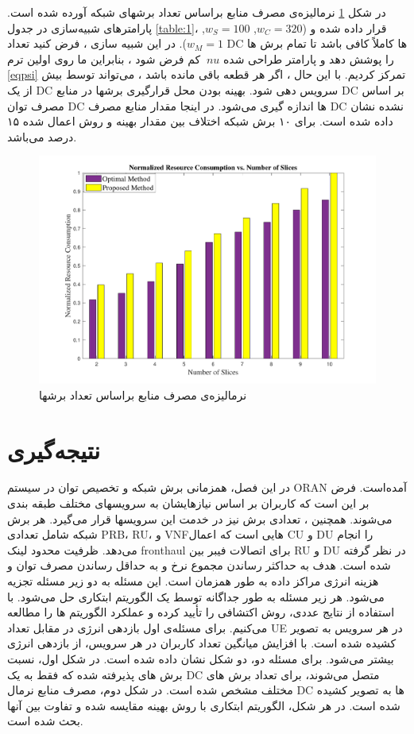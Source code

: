 در شکل \ref{fig:f2}
نرمالیزه‌ی مصرف منابع بر‌اساس تعداد برشهای شبکه آورده شده است. پارامترهای شبیه‌سازی در جدول \ref{table:1}، قرار داده شده و 
($w_C = 320$, $w_S = 100$, $w_M =1$).
در این شبیه سازی ، فرض کنید تعداد DC ها کاملاً کافی باشد تا تمام برش ها را پوشش دهد و پارامتر طراحی شده $ \ nu $ کم فرض شود ، بنابراین ما روی اولین ترم \eqref{eqpsi} تمرکز کردیم.
با این حال ، اگر هر قطعه باقی مانده باشد ، می‌تواند توسط بیش از یک DC سرویس دهی شود.
بهینه بودن محل قرارگیری برشها در منابع DC بر اساس مصرف توان DC ها اندازه گیری می‌شود.
در اینجا مقدار منابع  مصرف DC نشده نشان داده شده است. برای ۱۰ برش شبکه اختلاف بین مقدار بهینه و روش اعمال شده ۱۵ درصد می‌باشد. 
\begin{figure}%
	\centering
	\includegraphics[scale = 0.5]{./fig/fig22_last} %
	\caption{نرمالیزه‌ی مصرف منابع بر‌اساس تعداد برشها}
	\label{fig:f2}
\end{figure}
\section{نتیجه‌گیری}
در این فصل، همزمانی برش شبکه و تخصیص توان در سیستم ORAN آمده‌است. فرض بر این است که کاربران بر اساس نیازهایشان به سرویسهای مختلف طبقه بندی می‌شوند. همچنین ، تعدادی برش نیز در خدمت این سرویسها قرار می‌گیرد. هر برش شبکه شامل تعدادی PRB، RU، و VNFهایی است که اعمال CU و DU را انجام می‌دهد. ظرفیت محدود لینک fronthaul برای اتصالات فیبر بین RU و DU در نظر گرفته شده است.
هدف به حداکثر رساندن مجموع نرخ و به حداقل رساندن مصرف توان و هزینه انرژی مراکز داده به طور همزمان است.
این مسئله به دو زیر مسئله تجزیه می‌شود. هر زیر مسئله به طور جداگانه توسط یک الگوریتم ابتکاری حل می‌شود. با استفاده از نتایج عددی، روش اکتشافی را تأیید کرده و عملکرد الگوریتم ها را مطالعه می‌کنیم.
برای مسئله‌ی اول بازدهی انرژی در مقابل تعداد UE در هر سرویس به تصویر کشیده شده است.
با افزایش میانگین تعداد کاربران در هر سرویس، از بازدهی انرژی بیشتر می‌شود.
برای مسئله دو، دو شکل نشان داده شده است.
در شکل اول، نسبت برش های پذیرفته شده که فقط به یک DC متصل می‌شوند، برای تعداد برش های مختلف مشخص شده است.
در شکل دوم، مصرف منابع نرمال DC ها به تصویر کشیده شده است.
در هر شکل، الگوریتم ابتکاری با روش بهینه مقایسه شده و تفاوت بین آنها بحث شده است.

